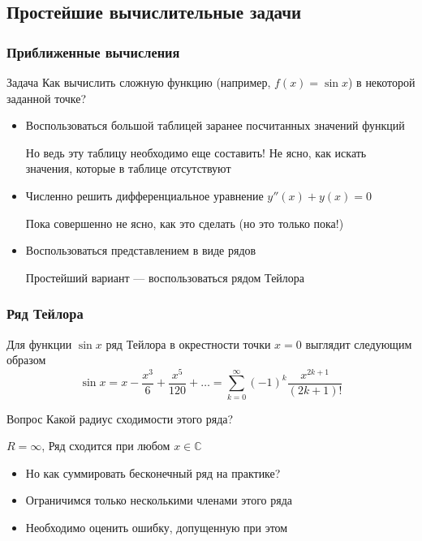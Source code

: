 \documentclass[aspectratio=169,unicode]{beamer}
\begin{document}
\subsection{Простейшие вычислительные задачи}
\begin{frame}
\frametitle{Приближенные вычисления}
\begin{block}{Задача}
	Как вычислить сложную функцию (например, $f(x) = \sin x$) в некоторой заданной точке?
\end{block}

\begin{itemize}
	\pause \item Воспользоваться большой таблицей заранее посчитанных значений функций
	\pause

	\alert{Но ведь эту таблицу необходимо еще составить!}
	\alert{Не ясно, как искать значения, которые в таблице отсутствуют}
	\pause \item Численно решить дифференциальное уравнение $y''(x) + y(x) = 0$
	\pause

	\alert{Пока совершенно не ясно, как это сделать (но это только пока!)}
	\pause \item Воспользоваться представлением в виде рядов
	\pause

	\textcolor{green!50!black}{Простейший вариант --- воспользоваться рядом Тейлора}
\end{itemize}
\end{frame}

\begin{frame}
\frametitle{Ряд Тейлора}
	Для функции $\sin x$ ряд Тейлора в окрестности точки $x=0$ выглядит следующим образом
	\[
	\sin x = x - \frac{x^3}{6} + \frac{x^5}{120} + \dots = \sum_{k=0}^{\infty} (-1)^k\frac{x^{2k+1}}{(2k+1)!}
	\]
	\pause
	\begin{block}{Вопрос}
	Какой радиус сходимости этого ряда?
	\pause

	$R = \infty$, Ряд сходится при любом $x \in \mathbb{C}$
	\end{block}
	\begin{itemize}
	\pause\item Но как суммировать бесконечный ряд на практике?
	\pause\item Ограничимся только несколькими членами этого ряда
	\pause\item Необходимо оценить ошибку, допущенную при этом
	\end{itemize}
\end{frame}
\end{document}
